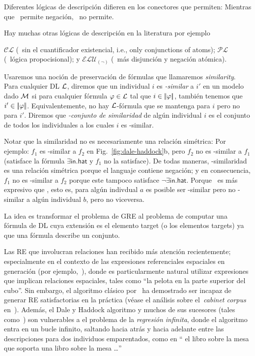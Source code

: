 Diferentes l\'ogicas de descripci\'on difieren en los conectores que permiten: Mientras que \alc\ permite negaci\'on, \el\
no permite. 

Hay muchas otras l\'ogicas de descripci\'on en la literatura por ejemplo 

$\mathcal{CL}$ (\el\ sin el cuantificador existencial, i.e., only
conjunctions of atoms); $\mathcal{PL}$ (\alc\ l\'ogica propocisional); y
$\mathcal{ELU}_{(\neg)}$ (\el\ m\'as disjunci\'on y negaci\'on at\'omica).

Usaremos una noci\'on de preservaci\'on de f\'ormulas que llamaremos
\emph{similarity}. Para cualquier DL $\mathcal{L}$, diremos que un individual $i$ es \emph{\gL-similar} a $i'$ en un modelo dado $\mathcal{M}$
si para cualquier f\'ormula $\varphi \in \mathcal{L}$ tal que $i \in
|\!|\varphi|\!|$, tambi\'en tenemos que $i' \in |\!|\varphi|\!|$.
Equivalentemente, no hay $\mathcal{L}$-f\'ormula que se mantenga para $i$ pero no para
$i'$.  Diremos que \emph{\gL-conjunto de similaridad } de alg\'un individual
$i$ es el conjunto de todos los individuales a los cuales $i$ es \gL-similar.

Notar que la similaridad no es necesariamente una relaci\'on sim\'etrica: Por ejemplo: $f_1$ es \el-similar a $f_2$ en
Fig.~\ref{fig:dale-haddock}b, pero $f_2$ no es \el-similar a $f_1$
(satisface la f\'ormula $\exists \mathsf{in}.\mathsf{hat}$ y $f_1$
no la satisface).  De todas maneras, \alc-similaridad es una relaci\'on sim\'etrica porque
el languaje contiene negaci\'on; y en consecuencia, $f_1$ no es \alc-similar
a $f_2$ porque este tampoco satisface $\neg \exists
\mathsf{in}.\mathsf{hat}$.  Porque \alc\ es m\'as expresivo que \el,
esto es, para alg\'un indivdual $a$ es posible ser \el-similar pero
no \alc-similar a alg\'un individual $b$, pero no viceversa.


La idea es transformar el problema de GRE al problema de computar una f\'ormula de DL cuya extensi\'on es el elemento target (o los elementos targets) ya que una f\'ormula describe un conjunto.

Las RE que involucran relaciones han recibido m\'as atenci\'on recientemente;
especialmente en el contexto de las expresiones referenciales espaciales en 
generaci\'on (por ejemplo,~\cite{kelleher06:increm}),
donde es particularmente natural utilizar expresiones que implican 
relaciones espaciales, tales como ``la pelota en la parte superior del cubo''. Sin embargo, el
algoritmo cl\'asico
por~\cite{dale91:gener} ha demostrado ser
incapaz de generar RE satisfactorias en la pr\'actica (v\'ease el an\'alisis sobre
el~\emph{cabinet corpus}
en~\cite{viethen06:_algor_for_gener_refer_expres}). Adem\'as, el
Dale y Haddock algoritmo y muchos de sus sucesores (tales
como~\cite{kelleher06:increm}) son vulnerables a
el problema de la \emph{regresi\'on infinita}, donde el algoritmo entra en un
bucle infinito, saltando hacia atr\'as y hacia adelante entre las descripciones para dos
individuos emparentados, como en `` el libro sobre la mesa que soporta una
libro sobre la mesa \ldots ''

